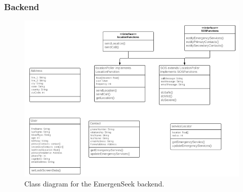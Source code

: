 \documentclass[10pt, a4paper]{article}
\begin{document}
\subsubsection{Backend}
\begin{figure}[H]
\begin{center}
\centerline{
	\includegraphics[scale=1.3]{final-diagrams/backend-class.PNG}
}
\caption{Class diagram for the EmergenSeek backend.}
\end{center}	
\end{figure}
\end{document}
